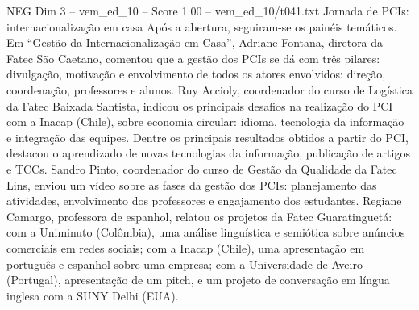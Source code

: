\begin{textsample}{NEG Dim 3 – vem\_ed\_10 – Score 1.00 – vem\_ed\_10/t041.txt}  \label{ex:f3_neg_042}
Jornada de PCIs: internacionalização em casa Após a abertura, seguiram-se os painéis temáticos.
Em “Gestão da Internacionalização em Casa”, Adriane Fontana, diretora da Fatec São Caetano, comentou que a gestão dos PCIs se dá com três pilares: divulgação, motivação e envolvimento de todos os atores envolvidos: direção, coordenação, professores e alunos.
Ruy Accioly, coordenador do curso de Logística da Fatec Baixada Santista, indicou os principais desafios na realização do PCI com a Inacap (Chile), sobre economia circular: idioma, tecnologia da informação e integração das equipes.
Dentre os principais resultados obtidos a partir do PCI, destacou o aprendizado de novas tecnologias da informação, publicação de artigos e TCCs.
Sandro Pinto, coordenador do curso de Gestão da Qualidade da Fatec Lins, enviou um vídeo sobre as fases da gestão dos PCIs: planejamento das atividades, envolvimento dos professores e engajamento dos estudantes.
Regiane Camargo, professora de espanhol, relatou os projetos da Fatec Guaratinguetá: com a Uniminuto (Colômbia), uma análise linguística e semiótica sobre anúncios comerciais em redes sociais; com a Inacap (Chile), uma apresentação em português e espanhol sobre uma empresa; com a Universidade de Aveiro (Portugal), apresentação de um pitch, e um projeto de conversação em língua inglesa com a SUNY Delhi (EUA).

\end{textsample}
